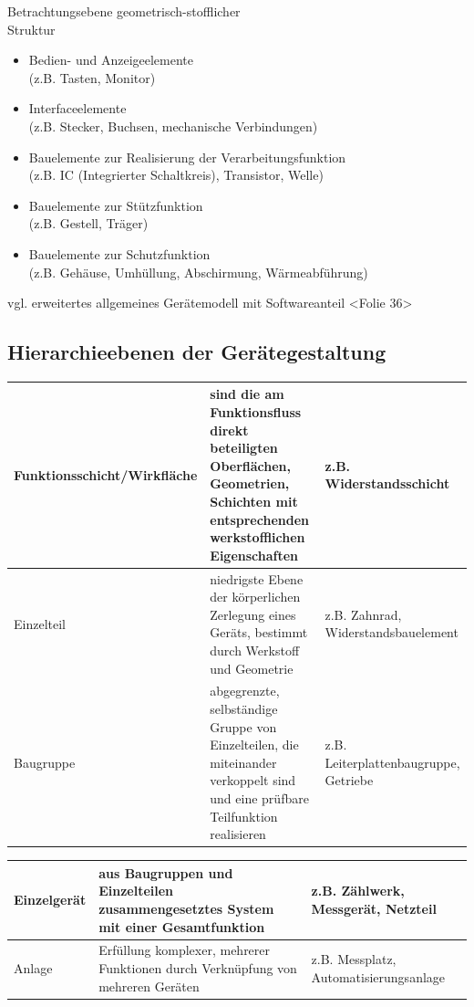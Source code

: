 \begin{minipage}{.3\textwidth}
	Betrachtungsebene geometrisch-stofflicher\\ Struktur
	\begin{itemize}
		\item Bedien- und Anzeigeelemente\\ (z.B. Tasten, Monitor)
		\item Interfaceelemente\\ (z.B. Stecker, Buchsen, mechanische Verbindungen)
		\item Bauelemente zur Realisierung der Verarbeitungsfunktion\\ (z.B. IC (Integrierter Schaltkreis), Transistor, Welle)
		\item Bauelemente zur Stützfunktion\\ (z.B. Gestell, Träger)
		\item Bauelemente zur Schutzfunktion\\ (z.B. Gehäuse, Umhüllung, Abschirmung, Wärmeabführung)
	\end{itemize}
\end{minipage}

\Ra vgl. erweitertes allgemeines Gerätemodell mit Softwareanteil <Folie 36>

\subsection{Hierarchieebenen der Gerätegestaltung}


\begin{tabular}{p{} p{} p{}}
\hline
Funktionsschicht/\newline Wirkfläche & sind die am Funktionsfluss direkt beteiligten Oberflächen, Geometrien, Schichten mit entsprechenden werkstofflichen Eigenschaften & z.B. Widerstandsschicht\\ \hline
Einzelteil & niedrigste Ebene der körperlichen Zerlegung eines Geräts, bestimmt durch Werkstoff und Geometrie & z.B. Zahnrad, Widerstandsbauelement\\ \hline
Baugruppe & abgegrenzte, selbständige Gruppe von Einzelteilen, die miteinander verkoppelt sind und eine prüfbare Teilfunktion realisieren & z.B. Leiterplattenbaugruppe, Getriebe\\ \hline
\end{tabular}

\begin{tabular}{p{} p{} p{}}
\hline
Einzelgerät & aus Baugruppen und Einzelteilen zusammengesetztes System mit einer Gesamtfunktion & z.B. Zählwerk, Messgerät, Netzteil\\ \hline
Anlage & Erfüllung komplexer, mehrerer Funktionen durch Verknüpfung von mehreren Geräten & z.B. Messplatz, Automatisierungsanlage\\ \hline
\end{tabular}

